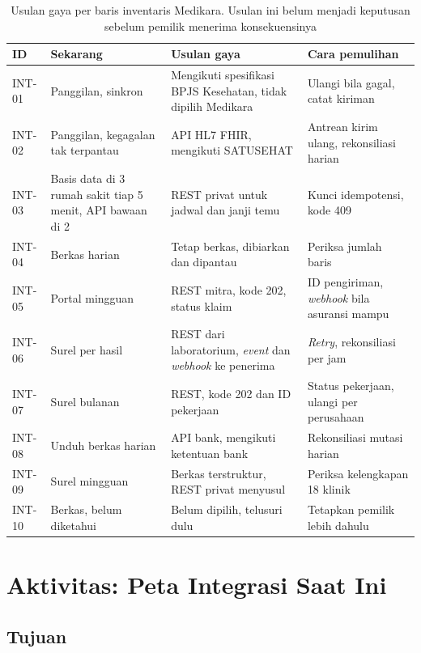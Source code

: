 \begin{table}[!htb]
  \centering
  \caption{Usulan gaya per baris inventaris Medikara. Usulan ini belum menjadi keputusan sebelum pemilik menerima konsekuensinya}
  \label{tab:ch05-usulan}
  \scriptsize
  \begin{tabularx}{\textwidth}{V{1.0cm}V{2.5cm}V{3.3cm}U}
    \hline
    \textbf{ID} & \textbf{Sekarang} & \textbf{Usulan gaya} & \textbf{Cara pemulihan} \\ \hline
    INT-01 & Panggilan, sinkron & Mengikuti spesifikasi BPJS Kesehatan, tidak dipilih Medikara & Ulangi bila gagal, catat kiriman \\ \hline
    INT-02 & Panggilan, kegagalan tak terpantau & API HL7 FHIR, mengikuti SATUSEHAT & Antrean kirim ulang, rekonsiliasi harian \\ \hline
    INT-03 & Basis data di 3 rumah sakit tiap 5 menit, API bawaan di 2 & REST privat untuk jadwal dan janji temu & Kunci idempotensi, kode 409 \\ \hline
    INT-04 & Berkas harian & Tetap berkas, dibiarkan dan dipantau & Periksa jumlah baris \\ \hline
    INT-05 & Portal mingguan & REST mitra, kode 202, status klaim & ID pengiriman, \textit{webhook} bila asuransi mampu \\ \hline
    INT-06 & Surel per hasil & REST dari laboratorium, \textit{event} dan \textit{webhook} ke penerima & \textit{Retry}, rekonsiliasi per jam \\ \hline
    INT-07 & Surel bulanan & REST, kode 202 dan ID pekerjaan & Status pekerjaan, ulangi per perusahaan \\ \hline
    INT-08 & Unduh berkas harian & API bank, mengikuti ketentuan bank & Rekonsiliasi mutasi harian \\ \hline
    INT-09 & Surel mingguan & Berkas terstruktur, REST privat menyusul & Periksa kelengkapan 18 klinik \\ \hline
    INT-10 & Berkas, belum diketahui & Belum dipilih, telusuri dulu & Tetapkan pemilik lebih dahulu \\ \hline
  \end{tabularx}
\end{table}

\section{Aktivitas: Peta Integrasi Saat Ini}

\subsection*{Tujuan}

